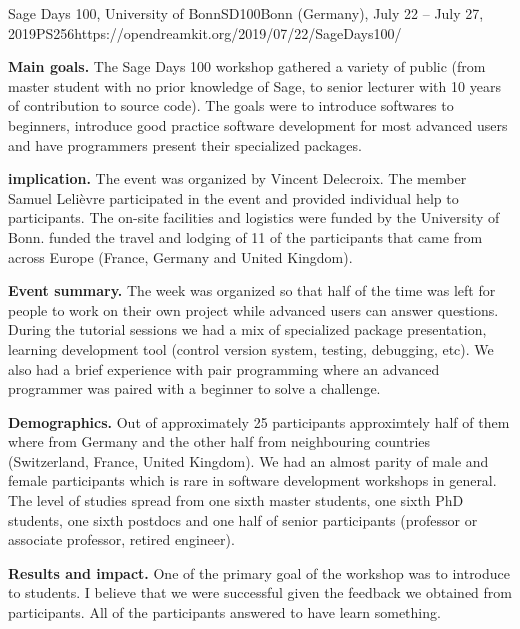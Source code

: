 \begin{event}{Sage Days 100, University of Bonn}{SD100}{Bonn (Germany), July 22 -- July 27, 2019}{PS}{25}{6}{https://opendreamkit.org/2019/07/22/SageDays100/}

\textbf{Main goals.} The Sage Days 100 workshop gathered a variety of public
(from master student with no prior knowledge
of Sage, to senior lecturer with 10 years of contribution to 
\Sage source code). The goals were to introduce \ODK softwares
to beginners, introduce good practice software development for
most advanced users and have programmers present their specialized
packages.

\textbf{\ODK implication.} The event was organized by Vincent Delecroix.
The \ODK member Samuel Leli\`evre participated in the event and
provided individual help to participants. The on-site facilities and
logistics were funded by the University of Bonn. \ODK funded the
travel and lodging of 11 of the participants that came from across
Europe (France, Germany and United Kingdom).

\textbf{Event summary.} The week was organized so that half of the
time was left for people to work on their own project while advanced
users can answer questions. During the tutorial sessions we had
a mix of specialized package presentation, learning development tool
(control version system, testing, debugging, etc). We also had a brief
experience with pair programming where an advanced programmer was
paired with a beginner to solve a challenge.


\textbf{Demographics.} Out of approximately 25 participants approximtely
half of them where from Germany and the other half from neighbouring
countries (Switzerland, France, United Kingdom). We had an almost parity
of male and female participants which is rare in software development
workshops in general. The level of studies spread from one sixth master students,
one sixth PhD students, one sixth postdocs and one half of senior participants
(professor or associate professor, retired engineer).


\textbf{Results and impact.} One of the primary goal of the workshop
was to introduce \Sage to students. I believe that we were successful
given the feedback we obtained from participants. All of the participants
answered to have learn something.

\end{event}

